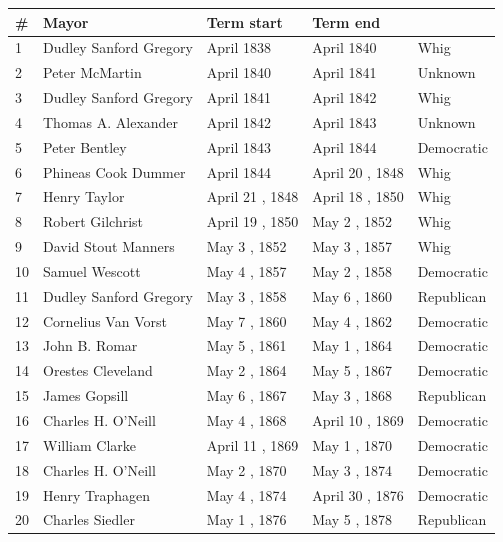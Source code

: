 \documentclass{article}
\begin{document}
\begin{tabular}{lllll}
\toprule
\# & Mayor & Term start & Term end &  \\
\midrule
1 & Dudley Sanford Gregory & April 1838 & April 1840 & Whig \\
2 & Peter McMartin & April 1840 & April 1841 & Unknown \\
3 & Dudley Sanford Gregory & April 1841 & April 1842 & Whig \\
4 & Thomas A. Alexander & April 1842 & April 1843 & Unknown \\
5 & Peter Bentley & April 1843 & April 1844 & Democratic \\
6 & Phineas Cook Dummer & April 1844 & April 20 , 1848 & Whig \\
7 & Henry Taylor & April 21 , 1848 & April 18 , 1850 & Whig \\
8 & Robert Gilchrist & April 19 , 1850 & May 2 , 1852 & Whig \\
9 & David Stout Manners & May 3 , 1852 & May 3 , 1857 & Whig \\
10 & Samuel Wescott & May 4 , 1857 & May 2 , 1858 & Democratic \\
11 & Dudley Sanford Gregory & May 3 , 1858 & May 6 , 1860 & Republican \\
12 & Cornelius Van Vorst & May 7 , 1860 & May 4 , 1862 & Democratic \\
13 & John B. Romar & May 5 , 1861 & May 1 , 1864 & Democratic \\
14 & Orestes Cleveland & May 2 , 1864 & May 5 , 1867 & Democratic \\
15 & James Gopsill & May 6 , 1867 & May 3 , 1868 & Republican \\
16 & Charles H. O'Neill & May 4 , 1868 & April 10 , 1869 & Democratic \\
17 & William Clarke & April 11 , 1869 & May 1 , 1870 & Democratic \\
18 & Charles H. O'Neill & May 2 , 1870 & May 3 , 1874 & Democratic \\
19 & Henry Traphagen & May 4 , 1874 & April 30 , 1876 & Democratic \\
20 & Charles Siedler & May 1 , 1876 & May 5 , 1878 & Republican \\
\bottomrule
\end{tabular}
\end{document}
